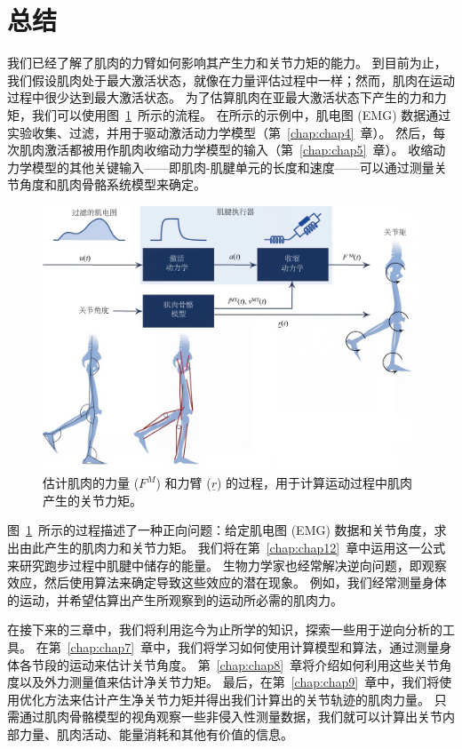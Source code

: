 \section{总结}

我们已经了解了肌肉的力臂如何影响其产生力和关节力矩的能力。
到目前为止，我们假设肌肉处于最大激活状态，就像在力量评估过程中一样；然而，肌肉在运动过程中很少达到最大激活状态。
为了估算肌肉在亚最大激活状态下产生的力和力矩，我们可以使用图~\ref{fig:6_17}~所示的流程。
在所示的示例中，肌电图 (EMG) 数据通过实验收集、过滤，并用于驱动激活动力学模型（第~\ref{chap:chap4}~章）。
然后，每次肌肉激活都被用作肌肉收缩动力学模型的输入（第~\ref{chap:chap5}~章）。
收缩动力学模型的其他关键输入——即肌肉-肌腱单元的长度和速度——可以通过测量关节角度和肌肉骨骼系统模型来确定。


\begin{figure}[!htb]
	\centering
	\includegraphics[width=1.0\linewidth]{chap6/6_17}
	\caption{估计肌肉的力量 ($F^M$) 和力臂 ($\underline{r}$) 的过程，用于计算运动过程中肌肉产生的关节力矩。 \label{fig:6_17}}
\end{figure}


图~\ref{fig:6_17}~所示的过程描述了一种正向问题：给定肌电图 (EMG) 数据和关节角度，求出由此产生的肌肉力和关节力矩。
我们将在第~\ref{chap:chap12}~章中运用这一公式来研究跑步过程中肌腱中储存的能量。
生物力学家也经常解决逆向问题，即观察效应，然后使用算法来确定导致这些效应的潜在现象。
例如，我们经常测量身体的运动，并希望估算出产生所观察到的运动所必需的肌肉力。


在接下来的三章中，我们将利用迄今为止所学的知识，探索一些用于逆向分析的工具。
在第~\ref{chap:chap7}~章中，我们将学习如何使用计算模型和算法，通过测量身体各节段的运动来估计关节角度。
第~\ref{chap:chap8}~章将介绍如何利用这些关节角度以及外力测量值来估计净关节力矩。
最后，在第~\ref{chap:chap9}~章中，我们将使用优化方法来估计产生净关节力矩并得出我们计算出的关节轨迹的肌肉力量。
只需通过肌肉骨骼模型的视角观察一些非侵入性测量数据，我们就可以计算出关节内部力量、肌肉活动、能量消耗和其他有价值的信息。



